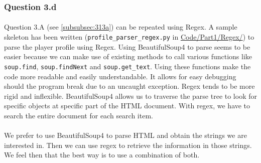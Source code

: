 \subsubsection{Question 3.d}
\label{subsubsec:313d}
\paragraph{}Question 3.A (see \ref{subsubsec:313a}) can be repeated using Regex. A sample skeleton has been written (\verb|profile_parser_regex.py| in \url{Code/Part1/Regex/}) to parse the player profile using Regex. Using BeautifulSoup4 to parse seems to be easier because we can make use of existing methods to call various functions like \verb|soup.find|, \verb|soup.findNext| and \verb|soup.get_text|. Using these functions make the code more readable and easily understandable. It allows for easy debugging should the program break due to an uncaught exception. Regex tends to be more rigid and inflexible. BeautifulSoup4 allows us to traverse the parse tree to look for specific objects at specific part of the HTML document. With regex, we have to search the entire document for each search item. 

\paragraph{}We prefer to use BeautifulSoup4 to parse HTML and obtain the strings we are interested in. Then we can use regex to retrieve the information in those strings. We feel then that the best way is to use a combination of both.
